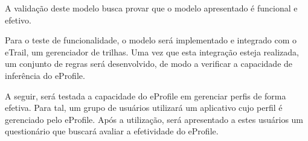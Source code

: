 A validação deste modelo busca provar que o modelo apresentado é funcional e efetivo.

Para o teste de funcionalidade, o modelo será implementado e integrado com o eTrail, um gerenciador de trilhas. Uma vez que esta integração esteja realizada, um conjunto de regras será desenvolvido, de modo a verificar a capacidade de inferência do eProfile.

A seguir, será testada a capacidade do eProfile em gerenciar perfis de forma efetiva. Para tal, um grupo de usuários utilizará um aplicativo cujo perfil é gerenciado pelo eProfile. Após a utilização, será apresentado a estes usuários um questionário que buscará avaliar a efetividade do eProfile.
